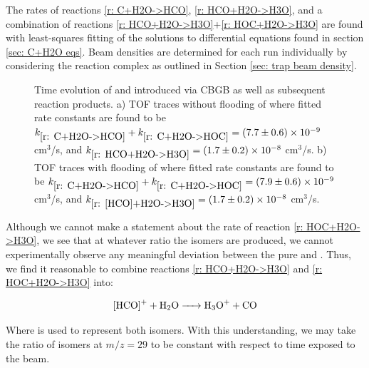 The rates of reactions \ref{r: C+H2O->HCO}, \ref{r: HCO+H2O->H3O}, and a combination of reactions \ref{r: HCO+H2O->H3O}+\ref{r: HOC+H2O->H3O} are found with least-squares fitting of the solutions to differential equations found in section \ref{sec: C+H2O eqs}. Beam densities are determined for each run individually by considering the  reaction complex as outlined in Section \ref{sec: trap beam density}.

\begin{figure}[H]
	\centering
	\caption{Time evolution of  and  introduced via CBGB as well as subsequent reaction products. a) TOF traces without flooding of  where fitted rate constants are found to be $k_{\ref{r: C+H2O->HCO}}+k_{\ref{r: C+H2O->HOC}} = (7.7 \pm 0.6) \times 10^{-9}$ cm$^3$/s, and $k_{\ref{r: HCO+H2O->H3O}} = (1.7 \pm 0.2) \times 10^{-8}$ cm$^3$/s. b) TOF traces with flooding of  where fitted rate constants are found to be $k_{\ref{r: C+H2O->HCO}}+k_{\ref{r: C+H2O->HOC}} = (7.9 \pm 0.6) \times 10^{-9}$ cm$^3$/s, and $k_{\ref{r: [HCO]+H2O->H3O}} = (1.7 \pm 0.2) \times 10^{-8}$ cm$^3$/s.}
	\label{fig: [HCO]+H2O rate}
\end{figure}

Although we cannot make a statement about the rate of reaction \ref{r: HOC+H2O->H3O}, we see that at whatever ratio the isomers are produced, we cannot experimentally observe any meaningful deviation between the pure  and . Thus, we find it reasonable to combine reactions \ref{r: HCO+H2O->H3O} and \ref{r: HOC+H2O->H3O} into:

\begin{equation}
\ce{[HCO]+ + H2O -> H3O+ + CO} \label{r: [HCO]+H2O->H3O}
\end{equation}

Where \ce{[HCO]+} is used to represent both isomers. With this understanding, we may take the ratio of isomers at $m/z=29$ to be constant with respect to time exposed to the beam.